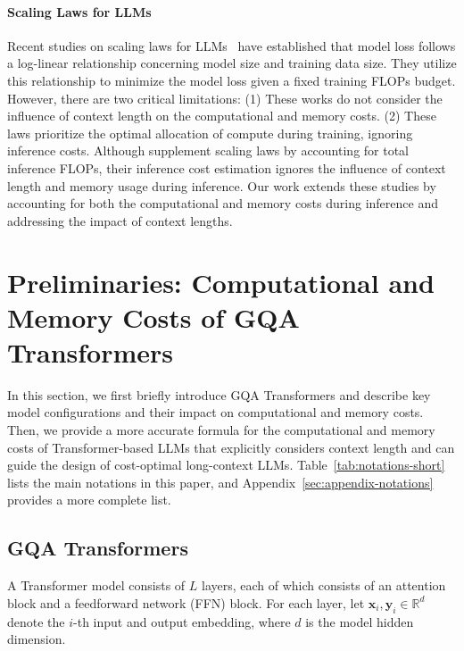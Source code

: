 \documentclass[11pt]{article}
\begin{document}
\paragraph{Scaling Laws for LLMs}
Recent studies on scaling laws for LLMs~\citep{deep-learning-scaling,scaling-law,chinchilla} have established that model loss follows a log-linear relationship concerning model size and training data size. 
They utilize this relationship to minimize the model loss given a fixed training FLOPs budget. However, there are two critical limitations:
(1) These works do not consider the influence of context length on the computational and memory costs.
(2) These laws prioritize the optimal allocation of compute during training, ignoring inference costs. Although \citet{beyond-chinchilla} supplement scaling laws by accounting for total inference FLOPs, their inference cost estimation ignores the influence of context length and memory usage during inference.
Our work extends these studies by accounting for both the computational and memory costs during inference and addressing the impact of context lengths.

\section{Preliminaries: Computational and Memory Costs of GQA Transformers}

In this section, we first briefly introduce GQA Transformers \citep{gqa} and describe key model configurations and their impact on computational and memory costs. Then, we provide a more accurate formula for the computational and memory costs of Transformer-based LLMs that explicitly considers context length and can guide the design of cost-optimal long-context LLMs.
Table~\ref{tab:notations-short} lists the main notations in this paper, and Appendix~\ref{sec:appendix-notations} provides a more complete list.

\subsection{GQA Transformers}
\label{sec:gqa-transformers}

A Transformer model consists of $L$ layers, each of which consists of an attention block and a feedforward network (FFN) block. For each layer, let $\mathbf{x}_i, \mathbf{y}_i \in \mathbb R^{d}$ denote the $i$-th input and output embedding, where $d$ is the model hidden dimension. 
\end{document}

